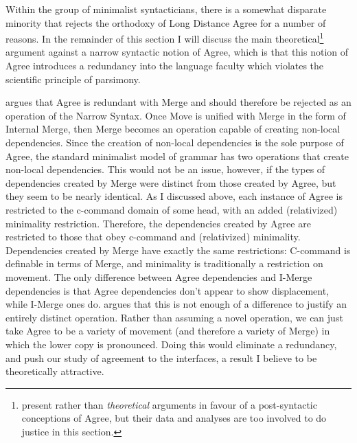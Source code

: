 \documentclass[MilwayThesis]{subfiles}
\begin{document}
Within the group of minimalist syntacticians, there is a somewhat disparate minority that rejects the orthodoxy of Long Distance Agree for a number of reasons.
In the remainder of this section I will discuss the main theoretical\footnote{
	\textcite{bobaljik2008wheres,arregi2013contextual} present \textcite{empirical} rather than \textit{theoretical} arguments in favour of a post-syntactic conceptions of Agree, but their data and analyses are too involved to do justice in this section. 
} argument against a narrow syntactic notion of Agree, which is that this notion of Agree introduces a redundancy into the language faculty which violates the scientific principle of parsimony.

\textcite{hornstein2009theory} argues that Agree is redundant with Merge and should therefore be rejected as an operation of the Narrow Syntax.
Once Move is unified with Merge in the form of Internal Merge, then Merge becomes an operation capable of creating non-local dependencies.
Since the creation of non-local dependencies is the sole purpose of Agree, the standard minimalist model of grammar has two operations that create non-local dependencies.
This would not be an issue, however, if the types of dependencies created by Merge were distinct from those created by Agree, but they seem to be nearly identical.
As I discussed above, each instance of Agree is restricted to the c-command domain of some head, with an added (relativized) minimality restriction.
Therefore, the dependencies created by Agree are restricted to those that obey c-command and (relativized) minimality.
Dependencies created by Merge have exactly the same restrictions:
C-command is definable in terms of Merge, and minimality is traditionally a restriction on movement.
The only difference between Agree dependencies and I-Merge dependencies is that Agree dependencies don't appear to show displacement, while I-Merge ones do.
\textcite{hornstein2009theory} argues that this is not enough of a difference to justify an entirely distinct operation.
Rather than assuming a novel operation, we can just take Agree to be a variety of movement (and therefore a variety of Merge) in which the lower copy is pronounced.
Doing this would eliminate a redundancy, and push our study of agreement to the interfaces, a result I believe to be theoretically attractive.
\end{document}

